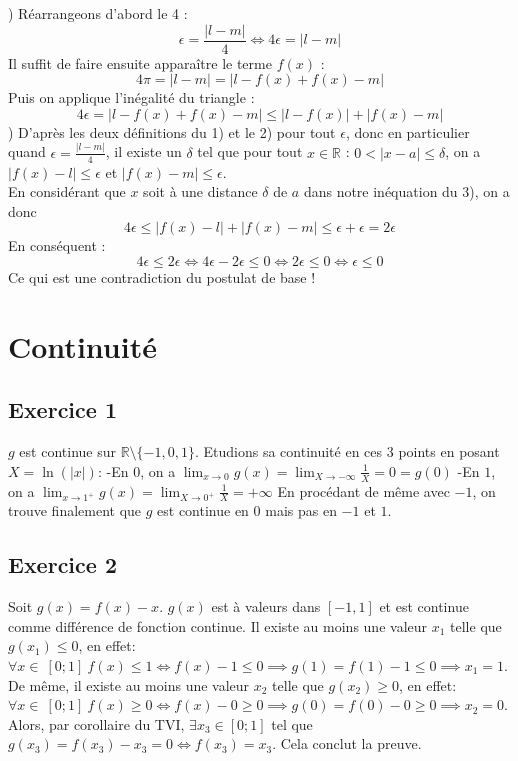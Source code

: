 \documentclass{article}
\begin{document}
) Réarrangeons d'abord le 4 : $$\epsilon = \frac{\lvert l - m \rvert}{4} \iff 4\epsilon = \lvert l - m \rvert$$
Il suffit de faire ensuite apparaître le terme $f(x)$ :
$$4\pi = \lvert l - m \rvert = \lvert l - f(x) + f(x) - m \rvert$$
Puis on applique l'inégalité du triangle :\\
$$4\epsilon = \lvert l - f(x) + f(x) - m \rvert \leq \lvert l - f(x) \rvert + \lvert f(x) - m \rvert $$
) D'après les deux définitions du 1) et le 2) pour tout $\epsilon$, donc en particulier quand $\epsilon = \frac{\lvert l - m \rvert}{4}$, il existe un $\delta$ tel que pour tout $x \in \mathbb{R}$ : $0 < \lvert x - a \rvert \leq \delta$, on a $\lvert f(x) - l \rvert \leq \epsilon$ et $\lvert f(x) - m \rvert \leq \epsilon$.\\
En considérant que $x$ soit à une distance $\delta$ de $a$ dans notre inéquation du 3), on a donc $$4\epsilon \leq \lvert f(x) - l \rvert + \lvert f(x) - m \rvert \leq \epsilon + \epsilon = 2\epsilon$$
En conséquent :
$$4\epsilon \leq 2\epsilon \iff 4\epsilon - 2\epsilon \leq 0 \iff 2 \epsilon \leq 0 \iff \epsilon \leq 0$$
Ce qui est une contradiction du postulat de base !

\section{Continuité}

\subsection{Exercice 1}
\noindent $g$ est continue sur $\mathbb{R}\setminus\{-1,0,1\}$. \newline
Etudions sa continuité en ces $3$ points en posant $X = \ln(|x|)$: \newline
-En $0$, on a $\displaystyle\lim_{x \to 0} g(x)=\lim_{X \to -\infty} \frac{1}{X}=0=g(0)$ \newline
-En $1$, on a $\displaystyle\lim_{x \to 1^{+}} g(x)=\lim_{X \to 0^{+}} \frac{1}{X}=+\infty$ \newline
En procédant de même avec $-1$, on trouve finalement que $g$ est continue en $0$ mais pas en $-1$ et $1$.

\subsection{Exercice 2}
\noindent Soit $g(x)=f(x)-x$. $g(x)$ est à valeurs dans $[-1,1]$ et est continue comme différence de fonction continue. Il existe au moins une valeur $x_1$ telle que $g(x_1) \leq 0$, en effet: $\forall x \in \ [0;1] \ f(x) \leq 1 \iff f(x) - 1 \leq 0 \implies g(1) = f(1) - 1 \leq 0 \implies x_1 = 1$. De même, il existe au moins une valeur $x_2$ telle que $g(x_2) \geq 0$, en effet: $\forall x \in \ [0;1] \ f(x) \geq 0 \iff f(x) - 0 \geq 0 \implies g(0) = f(0) - 0 \geq 0 \implies x_2 = 0$. Alors, par corollaire du TVI, $\exists x_3 \in [0;1]$ tel que $g(x_3) = f(x_3) - x_3 = 0 \iff f(x_3) = x_3$. Cela conclut la preuve.
\end{document}
